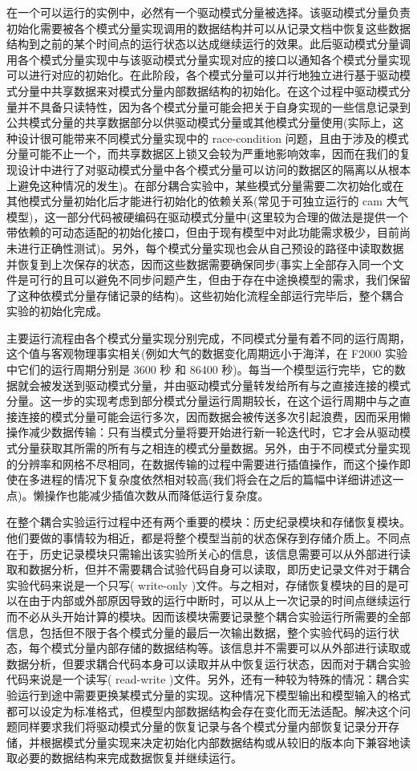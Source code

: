 在一个可以运行的实例中，必然有一个驱动模式分量被选择。该驱动模式分量负责初始化需要被各个模式分量实现调用的数据结构并可以从记录文档中恢复这些数据结构到之前的某个时间点的运行状态以达成继续运行的效果。此后驱动模式分量调用各个模式分量实现中与该驱动模式分量实现对应的接口以通知各个模式分量实现可以进行对应的初始化。在此阶段，各个模式分量可以并行地独立进行基于驱动模式分量中共享数据来对模式分量内部数据结构的初始化。在这个过程中驱动模式分量并不具备只读特性，因为各个模式分量可能会把关于自身实现的一些信息记录到公共模式分量的共享数据部分以供驱动模式分量或其他模式分量使用(实际上，这种设计很可能带来不同模式分量实现中的 race-condition 问题，且由于涉及的模式分量可能不止一个，而共享数据区上锁又会较为严重地影响效率，因而在我们的复现设计中进行了对驱动模式分量中各个模式分量可以访问的数据区的隔离以从根本上避免这种情况的发生)。在部分耦合实验中，某些模式分量需要二次初始化或在其他模式分量初始化后才能进行初始化的依赖关系(常见于可独立运行的 cam 大气模型)，这一部分代码被硬编码在驱动模式分量中(这里较为合理的做法是提供一个带依赖的可动态适配的初始化接口，但由于现有模型中对此功能需求极少，目前尚未进行正确性测试)。另外，每个模式分量实现也会从自己预设的路径中读取数据并恢复到上次保存的状态，因而这些数据需要确保同步(事实上全部存入同一个文件是可行的且可以避免不同步问题产生，但由于存在中途换模型的需求，我们保留了这种依模式分量存储记录的结构)。这些初始化流程全部运行完毕后，整个耦合实验的初始化完成。

主要运行流程由各个模式分量实现分别完成，不同模式分量有着不同的运行周期，这个值与客观物理事实相关(例如大气的数据变化周期远小于海洋，在 F2000 实验中它们的运行周期分别是 3600 秒 和 86400 秒)。每当一个模型运行完毕，它的数据就会被发送到驱动模式分量，并由驱动模式分量转发给所有与之直接连接的模式分量。这一步的实现考虑到部分模式分量运行周期较长，在这个运行周期中与之直接连接的模式分量可能会运行多次，因而数据会被传送多次引起浪费，因而采用懒操作减少数据传输：只有当模式分量将要开始进行新一轮迭代时，它才会从驱动模式分量获取其所需的所有与之相连的模式分量数据。另外，由于不同模式分量实现的分辨率和网格不尽相同，在数据传输的过程中需要进行插值操作，而这个操作即使在多进程的情况下复杂度依然相对较高(我们将会在之后的篇幅中详细讲述这一点)。懒操作也能减少插值次数从而降低运行复杂度。

在整个耦合实验运行过程中还有两个重要的模块：历史纪录模块和存储恢复模块。他们要做的事情较为相近，都是将整个模型当前的状态保存到存储介质上。不同点在于，历史记录模块只需输出该实验所关心的信息，该信息需要可以从外部进行读取和数据分析，但并不需要耦合试验代码自身可以读取，即历史记录文件对于耦合实验代码来说是一个只写( write-only )文件。与之相对，存储恢复模块的目的是可以在由于内部或外部原因导致的运行中断时，可以从上一次记录的时间点继续运行而不必从头开始计算的模块。因而该模块需要记录整个耦合实验运行所需要的全部信息，包括但不限于各个模式分量的最后一次输出数据，整个实验代码的运行状态，每个模式分量内部存储的数据结构等。该信息并不需要可以从外部进行读取或数据分析，但要求耦合代码本身可以读取并从中恢复运行状态，因而对于耦合实验代码来说是一个读写( read-write )文件。另外，还有一种较为特殊的情况：耦合实验运行到途中需要更换某模式分量的实现。这种情况下模型输出和模型输入的格式都可以设定为标准格式，但模型内部数据结构会存在变化而无法适配。解决这个问题同样要求我们将驱动模式分量的恢复记录与各个模式分量内部恢复记录分开存储，并根据模式分量实现来决定初始化内部数据结构或从较旧的版本向下兼容地读取必要的数据结构来完成数据恢复并继续运行。

